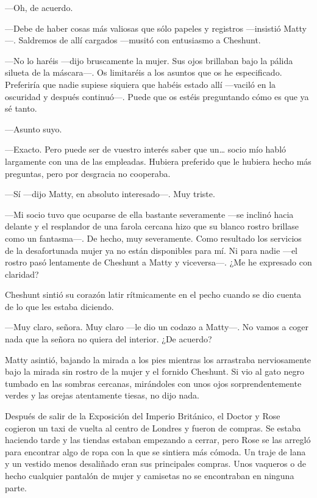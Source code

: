 {---Oh, de acuerdo.}

{---Debe de haber cosas más valiosas que sólo papeles y registros
	---insistió Matty---. Saldremos de allí cargados ---musitó con
entusiasmo a Cheshunt.}

{---No lo haréis ---dijo bruscamente la mujer. Sus ojos brillaban bajo
	la pálida silueta de la máscara---. Os limitaréis a los asuntos que os
	he especificado. Preferiría que nadie supiese siquiera que habéis estado
	allí ---vaciló en la oscuridad y después continuó---. Puede que os
estéis preguntando cómo es que ya sé tanto.}

{---Asunto suyo.}

{---Exacto. Pero puede ser de vuestro interés saber que un\ldots{} socio
	mío habló largamente con una de las empleadas. Hubiera preferido que le
hubiera hecho más preguntas, pero por desgracia no cooperaba.}

{---Sí ---dijo Matty, en absoluto interesado---. Muy triste.}

{---Mi socio tuvo que ocuparse de ella bastante severamente ---se
	inclinó hacia delante y el resplandor de una farola cercana hizo que su
	blanco rostro brillase como un fantasma---. De hecho, muy severamente.
	Como resultado los servicios de la desafortunada mujer ya no están
	disponibles para mí. Ni para nadie ---el rostro pasó lentamente de
Cheshunt a Matty y viceversa---. ¿Me he expresado con claridad?}

{Cheshunt sintió su corazón latir rítmicamente en el pecho cuando se dio
cuenta de lo que les estaba diciendo.}

{---Muy claro, señora. Muy claro ---le dio un codazo a Matty---. No
vamos a coger nada que la señora no quiera del interior. ¿De acuerdo?}

{Matty asintió, bajando la mirada a los pies mientras los arrastraba
	nerviosamente bajo la mirada sin rostro de la mujer y el fornido
	Cheshunt. Si vio al gato negro tumbado en las sombras cercanas,
	mirándoles con unos ojos sorprendentemente verdes y las orejas
atentamente tiesas, no dijo nada.}

\mbox{}

{Después de salir de la Exposición del Imperio Británico, el Doctor y
	Rose cogieron un taxi de vuelta al centro de Londres y fueron de
	compras. Se estaba haciendo tarde y las tiendas estaban empezando a
	cerrar, pero Rose se las arregló para encontrar algo de ropa con la que
	se sintiera más cómoda. Un traje de lana y un vestido menos desaliñado
	eran sus principales compras. Unos vaqueros o de hecho cualquier
pantalón de mujer y camisetas no se encontraban en ninguna parte.}

